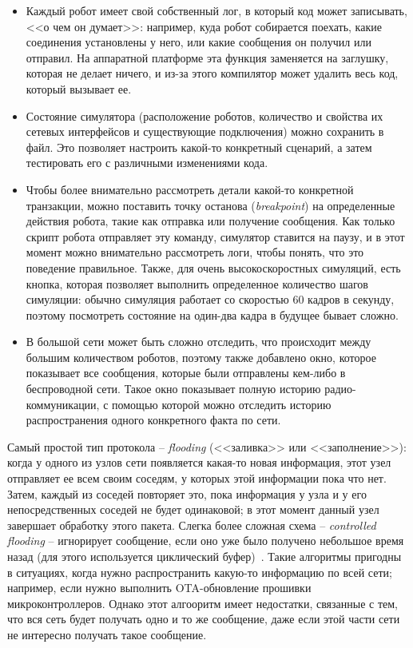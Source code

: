 \documentclass[%
]{report}
\begin{document}
\begin{itemize}
  \item Каждый робот имеет свой собственный лог,
  в который код может записывать, <<о чем он думает>>: 
  например, куда робот собирается поехать,
  какие соединения установлены у него,
  или какие сообщения он получил или отправил.
  На аппаратной платформе эта функция заменяется на заглушку, которая не делает ничего,
  и из-за этого компилятор может удалить весь код, который вызывает ее.
  \item Состояние симулятора (расположение роботов, количество и свойства их сетевых интерфейсов
  и существующие подключения) можно сохранить в файл.
  Это позволяет настроить какой-то конкретный сценарий,
  а затем тестировать его с различными изменениями кода.
  \item Чтобы более внимательно рассмотреть детали какой-то конкретной транзакции,
  можно поставить точку останова (\emph{breakpoint}) на определенные действия робота,
  такие как отправка или получение сообщения.
  Как только скрипт робота отправляет эту команду,
  симулятор ставится на паузу,
  и в этот момент можно внимательно рассмотреть логи,
  чтобы понять, что это поведение правильное.
  Также, для очень высокоскоростных симуляций,
  есть кнопка, которая позволяет выполнить определенное количество шагов симуляции:
  обычно симуляция работает со скоростью 60 кадров в секунду,
  поэтому посмотреть состояние на один-два кадра в будущее бывает сложно.
  \item В большой сети может быть сложно отследить, что происходит между большим количеством роботов,
  поэтому также добавлено окно, которое показывает все сообщения,
  которые были отправлены кем-либо в беспроводной сети.
  Такое окно показывает полную историю радио-коммуникации,
  с помощью которой можно отследить историю распространения одного конкретного факта по сети.  
\end{itemize}

Самый простой тип протокола -- \emph{flooding} (<<заливка>> или <<заполнение>>):
когда у одного из узлов сети появляется какая-то новая информация,
этот узел отправляет ее всем своим соседям, у которых этой информации пока что нет.
Затем, каждый из соседей повторяет это, пока информация у узла и у его непосредственных соседей
не будет одинаковой;
в этот момент данный узел завершает обработку этого пакета.
Слегка более сложная схема -- \emph{controlled flooding} -- игнорирует сообщение,
если оно уже было получено небольшое время назад (для этого
используется циклический буфер)~\cite{rahman2004controlled}.
Такие алгоритмы пригодны в ситуациях,
когда нужно распространить какую-то информацию по всей сети;
например, если нужно выполнить OTA-обновление прошивки микроконтроллеров.
Однако этот алгооритм имеет недостатки,
связанные с тем, что вся сеть будет получать одно и то же сообщение,
даже если этой части сети не интересно получать такое сообщение.
\end{document}
